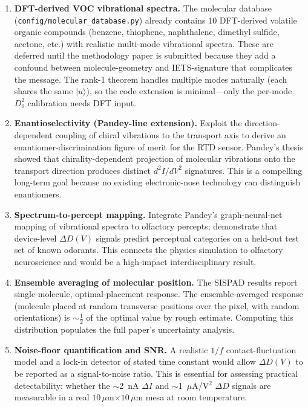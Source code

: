 \documentclass[11pt,a4paper,onecolumn]{article}
\newcommand{\code}[1]{\texttt{\small #1}}
\begin{document}
\begin{enumerate}[leftmargin=1.3em,itemsep=4pt]
\item \textbf{DFT-derived VOC vibrational spectra.}
The molecular database (\code{config/molecular\_database.py}) already
contains 10 DFT-derived volatile organic compounds (benzene, thiophene,
naphthalene, dimethyl sulfide, acetone, etc.) with realistic multi-mode
vibrational spectra. These are deferred until the methodology paper is
submitted because they add a confound between molecule-geometry and
IETS-signature that complicates the message. The rank-1 theorem handles
multiple modes naturally (each shares the same $|u\rangle$), so the
code extension is minimal---only the per-mode $D_0^2$ calibration needs
DFT input.

\item \textbf{Enantioselectivity (Pandey-line extension).} Exploit the
direction-dependent coupling of chiral vibrations to the transport axis to
derive an enantiomer-discrimination figure of merit for the RTD sensor.
Pandey's thesis showed that chirality-dependent projection of molecular
vibrations onto the transport direction produces distinct $d^2I/dV^2$
signatures. This is a compelling long-term goal because no existing
electronic-nose technology can distinguish enantiomers.

\item \textbf{Spectrum-to-percept mapping.} Integrate Pandey's
graph-neural-net mapping of vibrational spectra to olfactory percepts;
demonstrate that device-level $\Delta D(V)$ signals predict perceptual
categories on a held-out test set of known odorants. This connects the
physics simulation to olfactory neuroscience and would be a high-impact
interdisciplinary result.

\item \textbf{Ensemble averaging of molecular position.}
The SISPAD results report single-molecule, optimal-placement response.
The ensemble-averaged response (molecule placed at random transverse
positions over the pixel, with random orientations) is
$\sim\!\tfrac12$ of the optimal value by rough estimate. Computing
this distribution populates the full paper's uncertainty analysis.

\item \textbf{Noise-floor quantification and SNR.}
A realistic $1/f$ contact-fluctuation model and a lock-in detector of
stated time constant would allow $\Delta D(V)$ to be reported as a
signal-to-noise ratio. This is essential for assessing practical
detectability: whether the $\sim$2~nA $\Delta I$ and
$\sim$1~$\mu$A/V$^2$ $\Delta D$ signals are measurable in a real
$10\,\mu$m$\times 10\,\mu$m mesa at room temperature.


\end{enumerate}
\end{document}

